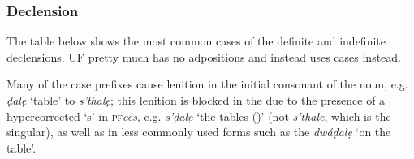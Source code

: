 \documentclass[a4paper, 12pt, twoside, final]{article}
\def\pfabbr{{\normalfont\scshape pf\space}}
\def\pf#1{\pfabbr\textit{#1}}
\let \w \textit
\begin{document}
\subsubsection{Declension}\label{subsubsec:declension}
The table below shows the most common cases of the definite and indefinite declensions. UF pretty much has no
adpositions and instead uses cases instead.

Many of the case prefixes cause lenition in the initial consonant of the noun, e.g. \w{ḍalẹ} ‘table’ to
 \w{s’thalẹ}; this lenition is blocked in the  due to the presence of a hypercorrected ‘s’
in \pf{ces}, e.g. \w{s’ḍalẹ} ‘the tables ()’ (not \w{s’thalẹ}, which is the singular), as well as in
less commonly used forms such as the  \w{dwáḍalẹ} ‘on the table’.
\end{document}
